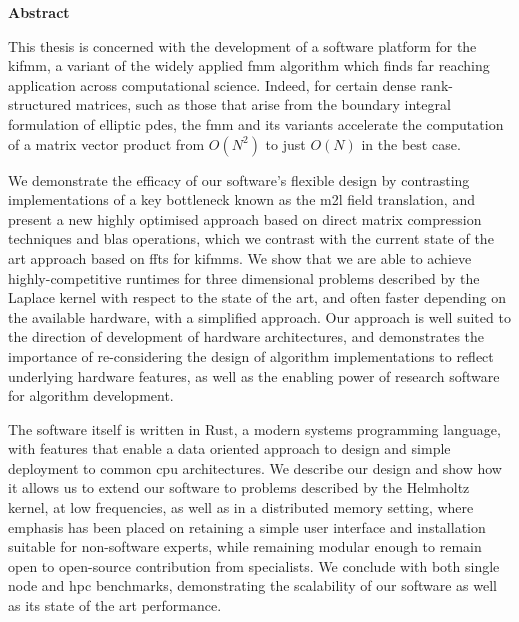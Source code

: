 \thispagestyle{plain}

\begin{center}
    \textbf{Abstract}
\end{center}

This thesis is concerned with the development of a software platform for the \acrfull{kifmm}, a variant of the widely applied \acrfull{fmm} algorithm which finds far reaching application across computational science. Indeed, for certain dense rank-structured matrices, such as those that arise from the boundary integral formulation of elliptic \acrfull{pdes}, the \acrshort{fmm} and its variants accelerate the computation of a matrix vector product from $O(N^2)$ to just $O(N)$ in the best case.

We demonstrate the efficacy of our software's flexible design by contrasting implementations of a key bottleneck known as the \acrfull{m2l} field translation, and present a new highly optimised approach based on direct matrix compression techniques and \acrshort{blas} operations, which we contrast with the current state of the art approach based on \acrfull{ffts} for \acrshort{kifmm}s. We show that we are able to achieve highly-competitive runtimes for three dimensional problems described by the Laplace kernel with respect to the state of the art, and often faster depending on the available hardware, with a simplified approach. Our approach is well suited to the direction of development of hardware architectures, and demonstrates the importance of re-considering the design of algorithm implementations to reflect underlying hardware features, as well as the enabling power of research software for algorithm development.

The software itself is written in Rust, a modern systems programming language, with features that enable a data oriented approach to design and simple deployment to common \acrshort{cpu} architectures. We describe our design and show how it allows us to extend our software to problems described by the  Helmholtz kernel, at low frequencies, as well as in a distributed memory setting, where emphasis has been placed on retaining a simple user interface and installation suitable for non-software experts, while remaining modular enough to remain open to open-source contribution from specialists. We conclude with both single node and \acrshort{hpc} benchmarks, demonstrating the scalability of our software as well as its state of the art performance.
